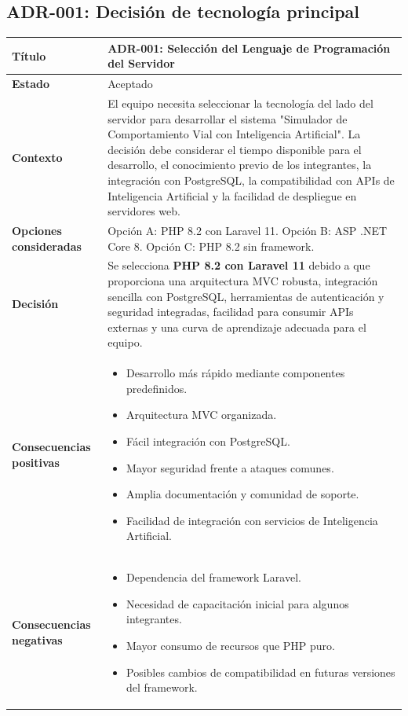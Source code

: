 \documentclass[12pt]{article}
\begin{document}
\subsection{ADR-001: Decisión de tecnología principal}
\begin{table}[H]
\centering
\begin{tabular}{|p{3cm}|p{11cm}|}
\hline
\textbf{Título} & \textbf{ADR-001: Selección del Lenguaje de Programación del Servidor} \\ \hline
\textbf{Estado} & Aceptado \\ \hline
\textbf{Contexto} & El equipo necesita seleccionar la tecnología del lado del servidor para desarrollar el sistema "Simulador de Comportamiento Vial con Inteligencia Artificial". La decisión debe considerar el tiempo disponible para el desarrollo, el conocimiento previo de los integrantes, la integración con PostgreSQL, la compatibilidad con APIs de Inteligencia Artificial y la facilidad de despliegue en servidores web. \\ \hline
\textbf{Opciones consideradas} & Opción A: PHP 8.2 con Laravel 11. Opción B: ASP .NET Core 8. Opción C: PHP 8.2 sin framework. \\ \hline
\textbf{Decisión} & Se selecciona \textbf{PHP 8.2 con Laravel 11} debido a que proporciona una arquitectura MVC robusta, integración sencilla con PostgreSQL, herramientas de autenticación y seguridad integradas, facilidad para consumir APIs externas y una curva de aprendizaje adecuada para el equipo. \\ \hline
\textbf{Consecuencias positivas} & \begin{itemize}[leftmargin=*,nosep]
    \item Desarrollo más rápido mediante componentes predefinidos.
    \item Arquitectura MVC organizada.
    \item Fácil integración con PostgreSQL.
    \item Mayor seguridad frente a ataques comunes.
    \item Amplia documentación y comunidad de soporte.
    \item Facilidad de integración con servicios de Inteligencia Artificial.
\end{itemize} \\ \hline
\textbf{Consecuencias negativas} & \begin{itemize}[leftmargin=*,nosep]
    \item Dependencia del framework Laravel.
    \item Necesidad de capacitación inicial para algunos integrantes.
    \item Mayor consumo de recursos que PHP puro.
    \item Posibles cambios de compatibilidad en futuras versiones del framework.
\end{itemize} \\ \hline
\end{tabular}
\end{table}
\end{document}
